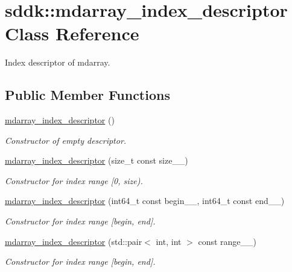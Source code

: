 \hypertarget{classsddk_1_1mdarray__index__descriptor}{}\section{sddk\+:\+:mdarray\+\_\+index\+\_\+descriptor Class Reference}
\label{classsddk_1_1mdarray__index__descriptor}


Index descriptor of mdarray.  


\subsection*{Public Member Functions}
\begin{DoxyCompactItemize}
\item 
\hyperlink{classsddk_1_1mdarray__index__descriptor_a179bd090e69d9d0b8ac70f2adf12b123}{mdarray\+\_\+index\+\_\+descriptor} ()
\begin{DoxyCompactList}\small\item\em Constructor of empty descriptor. \end{DoxyCompactList}\item 
\hyperlink{classsddk_1_1mdarray__index__descriptor_a0306668093722ee0161f0277ac2f0680}{mdarray\+\_\+index\+\_\+descriptor} (size\+\_\+t const size\+\_\+\+\_\+)
\begin{DoxyCompactList}\small\item\em Constructor for index range \mbox{[}0, size). \end{DoxyCompactList}\item 
\hyperlink{classsddk_1_1mdarray__index__descriptor_a9c3e2ae349ea0aade9ab3ac721010825}{mdarray\+\_\+index\+\_\+descriptor} (int64\+\_\+t const begin\+\_\+\+\_\+, int64\+\_\+t const end\+\_\+\+\_\+)
\begin{DoxyCompactList}\small\item\em Constructor for index range \mbox{[}begin, end\mbox{]}. \end{DoxyCompactList}\item 
\hyperlink{classsddk_1_1mdarray__index__descriptor_abba7a6ed3280b56483d80a2cc3bfe653}{mdarray\+\_\+index\+\_\+descriptor} (std\+::pair$<$ int, int $>$ const range\+\_\+\+\_\+)
\begin{DoxyCompactList}\small\item\em Constructor for index range \mbox{[}begin, end\mbox{]}. \end{DoxyCompactList}\item 

\end{DoxyCompactItemize}
